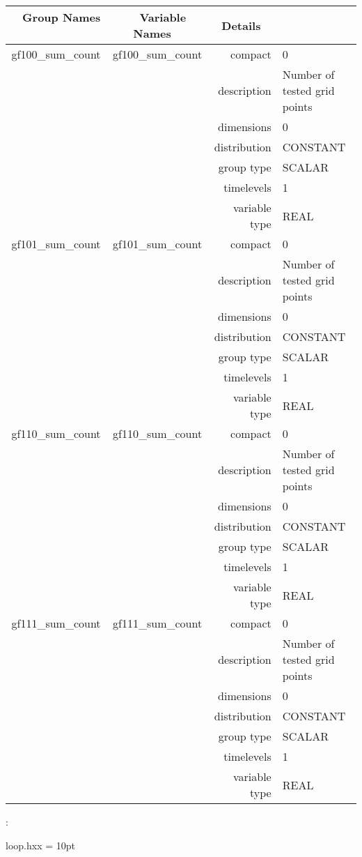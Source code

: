 \begin{tabular*}{150mm}{|c|c@{\extracolsep{\fill}}|rl|} \hline 
~ {\bf Group Names} ~ & ~ {\bf Variable Names} ~  &{\bf Details} ~ & ~ \\ 
\hline 
gf100\_sum\_count & gf100\_sum\_count & compact & 0 \\ 
 &  & description & Number of tested grid points \\ 
 &  & dimensions & 0 \\ 
 &  & distribution & CONSTANT \\ 
 &  & group type & SCALAR \\ 
 &  & timelevels & 1 \\ 
 &  & variable type & REAL \\ 
\hline 
gf101\_sum\_count & gf101\_sum\_count & compact & 0 \\ 
 &  & description & Number of tested grid points \\ 
 &  & dimensions & 0 \\ 
 &  & distribution & CONSTANT \\ 
 &  & group type & SCALAR \\ 
 &  & timelevels & 1 \\ 
 &  & variable type & REAL \\ 
\hline 
gf110\_sum\_count & gf110\_sum\_count & compact & 0 \\ 
 &  & description & Number of tested grid points \\ 
 &  & dimensions & 0 \\ 
 &  & distribution & CONSTANT \\ 
 &  & group type & SCALAR \\ 
 &  & timelevels & 1 \\ 
 &  & variable type & REAL \\ 
\hline 
gf111\_sum\_count & gf111\_sum\_count & compact & 0 \\ 
 &  & description & Number of tested grid points \\ 
 &  & dimensions & 0 \\ 
 &  & distribution & CONSTANT \\ 
 &  & group type & SCALAR \\ 
 &  & timelevels & 1 \\ 
 &  & variable type & REAL \\ 
\hline 
\end{tabular*} 



\vspace{5mm}

: 

loop.hxx
\vspace{2mm}\parskip = 10pt 
